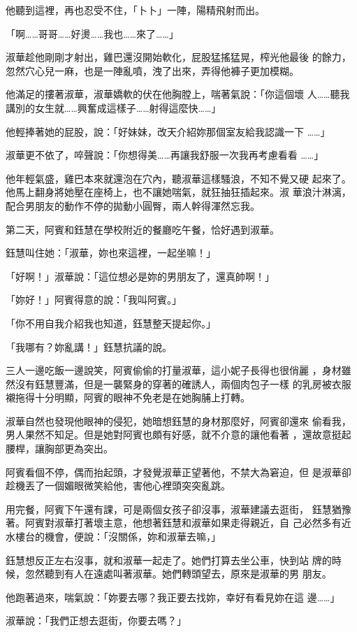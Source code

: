 他聽到這裡，再也忍受不住，「卜卜」一陣，陽精飛射而出。

「啊……哥哥……好燙……我也……來了……」

淑華趁他剛剛才射出，雞巴還沒開始軟化，屁股猛搖猛晃，榨光他最後
的餘力，忽然穴心兒一麻，也是一陣亂噴，洩了出來，弄得他褲子更加模糊。

他滿足的摟著淑華，淑華嬌軟的伏在他胸膛上，喘著氣說：「你這個壞
人……聽我講別的女生就……興奮成這樣子……射得這麼快……」

他輕捧著她的屁股，說：「好妹妹，改天介紹妳那個室友給我認識一下
……」

淑華更不依了，啐聲說：「你想得美……再讓我舒服一次我再考慮看看
……」

他年輕氣盛，雞巴本來就還泡在穴內，聽淑華這樣騷浪，不知不覺又硬
起來了。他馬上翻身將她壓在座椅上，也不讓她喘氣，就狂抽狂插起來。淑
華浪汁淋漓，配合男朋友的動作不停的拋動小圓臀，兩人幹得渾然忘我。

第二天，阿賓和鈺慧在學校附近的餐廳吃午餐，恰好遇到淑華。

鈺慧叫住她：「淑華，妳也來這裡，一起坐嘛！」

「好啊！」淑華說：「這位想必是妳的男朋友了，還真帥啊！」

「妳好！」阿賓得意的說：「我叫阿賓。」

「你不用自我介紹我也知道，鈺慧整天提起你。」

「我哪有？妳亂講！」鈺慧抗議的說。

三人一邊吃飯一邊說笑，阿賓偷偷的打量淑華，這小妮子長得也很俏麗
，身材雖然沒有鈺慧豐滿，但是一襲緊身的穿著的確誘人，兩個肉包子一樣
的乳房被衣服襯拖得十分明顯，阿賓的眼神不免老是在她胸脯上打轉。

淑華自然也發現他眼神的侵犯，她暗想鈺慧的身材那麼好，阿賓卻還來
偷看我，男人果然不知足。但是她對阿賓也頗有好感，就不介意的讓他看著
，還故意挺起腰桿，讓胸部更為突出。

阿賓看個不停，偶而抬起頭，才發覺淑華正望著他，不禁大為窘迫，但
是淑華卻趁機丟了一個媚眼微笑給他，害他心裡頭突突亂跳。

用完餐，阿賓下午還有課，可是兩個女孩子卻沒事，淑華建議去逛街，
鈺慧猶豫著。阿賓對淑華打著壞主意，他想著鈺慧和淑華如果走得親近，自
己必然多有近水樓台的機會，便說：「沒關係，妳和淑華去嘛，」

鈺慧想反正左右沒事，就和淑華一起走了。她們打算去坐公車，快到站
牌的時候，忽然聽到有人在遠處叫著淑華。她們轉頭望去，原來是淑華的男
朋友。

他跑著過來，喘氣說：「妳要去哪？我正要去找妳，幸好有看見妳在這
邊……」

淑華說：「我們正想去逛街，你要去嗎？」

